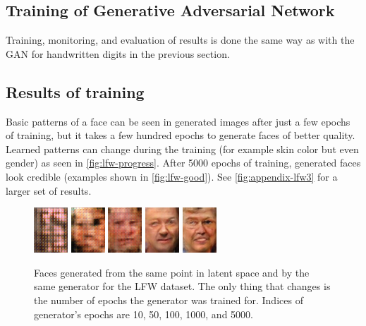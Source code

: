 \subsection*{Training of Generative Adversarial Network}
Training, monitoring, and evaluation of results is done the same way as with the GAN for handwritten digits in the previous section.

\subsection*{Results of training}
Basic patterns of a face can be seen in generated images after just a few epochs of training, but it takes a few hundred epochs to generate faces of better quality. Learned patterns can change during the training (for example skin color but even gender) as seen in \autoref{fig:lfw-progress}. After 5000 epochs of training, generated faces look credible (examples shown in \autoref{fig:lfw-good}). See \autoref{fig:appendix-lfw3} for a larger set of results.

\begin{figure}[!h]
    \centering
    \includegraphics[scale=1.5]{figures/lfw/lfw64x48color_progress0010.png}
    \includegraphics[scale=1.5]{figures/lfw/lfw64x48color_progress0050.png}
    \includegraphics[scale=1.5]{figures/lfw/lfw64x48color_progress0100.png}
    \includegraphics[scale=1.5]{figures/lfw/lfw64x48color_progress1000.png}
    \includegraphics[scale=1.5]{figures/lfw/lfw64x48color_progress5000.png}
    \caption{\label{fig:lfw-progress}Faces generated from the same point in latent space and by the same generator for the LFW dataset. The only thing that changes is the number of epochs the generator was trained for. Indices of generator's epochs are 10, 50, 100, 1000, and 5000.}
\end{figure}


